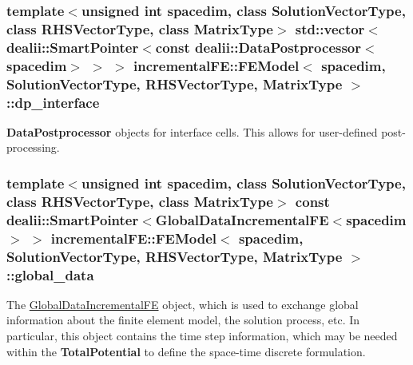 \subsubsection[{\texorpdfstring{dp\+\_\+interface}{dp_interface}}]{\setlength{\rightskip}{0pt plus 5cm}template$<$unsigned int spacedim, class Solution\+Vector\+Type, class R\+H\+S\+Vector\+Type, class Matrix\+Type$>$ std\+::vector$<$dealii\+::\+Smart\+Pointer$<$const dealii\+::\+Data\+Postprocessor$<$spacedim$>$ $>$ $>$ {\bf incremental\+F\+E\+::\+F\+E\+Model}$<$ spacedim, Solution\+Vector\+Type, R\+H\+S\+Vector\+Type, Matrix\+Type $>$\+::dp\+\_\+interface\hspace{0.3cm}{\ttfamily [private]}}\hypertarget{classincremental_f_e_1_1_f_e_model_adeb548ba39fe59036312bb8ba1d8cbf9}{}\label{classincremental_f_e_1_1_f_e_model_adeb548ba39fe59036312bb8ba1d8cbf9}
{\bf Data\+Postprocessor} objects for interface cells. This allows for user-\/defined post-\/processing. 
\subsubsection[{\texorpdfstring{global\+\_\+data}{global_data}}]{\setlength{\rightskip}{0pt plus 5cm}template$<$unsigned int spacedim, class Solution\+Vector\+Type, class R\+H\+S\+Vector\+Type, class Matrix\+Type$>$ const dealii\+::\+Smart\+Pointer$<${\bf Global\+Data\+Incremental\+FE}$<$spacedim$>$ $>$ {\bf incremental\+F\+E\+::\+F\+E\+Model}$<$ spacedim, Solution\+Vector\+Type, R\+H\+S\+Vector\+Type, Matrix\+Type $>$\+::global\+\_\+data\hspace{0.3cm}{\ttfamily [private]}}\hypertarget{classincremental_f_e_1_1_f_e_model_aa6f80778241b26906af1f571517102dd}{}\label{classincremental_f_e_1_1_f_e_model_aa6f80778241b26906af1f571517102dd}
The \hyperlink{classincremental_f_e_1_1_global_data_incremental_f_e}{Global\+Data\+Incremental\+FE} object, which is used to exchange global information about the finite element model, the solution process, etc. In particular, this object contains the time step information, which may be needed within the {\bf Total\+Potential} to define the space-\/time discrete formulation. 

